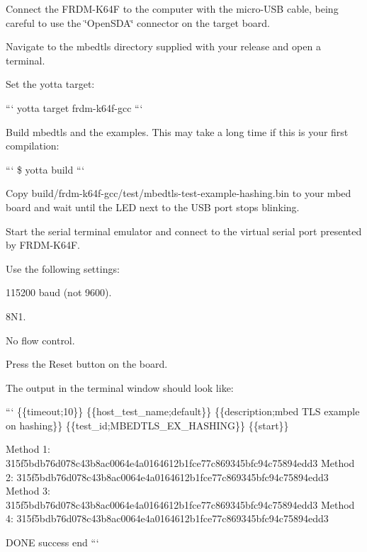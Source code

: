 \begin{DoxyEnumerate}
\item Connect the F\-R\-D\-M-\/\-K64\-F to the computer with the micro-\/\-U\-S\-B cable, being careful to use the \char`\"{}\-Open\-S\-D\-A\char`\"{} connector on the target board.
\item Navigate to the mbedtls directory supplied with your release and open a terminal.
\item Set the yotta target\-:

``` yotta target frdm-\/k64f-\/gcc ```
\item Build mbedtls and the examples. This may take a long time if this is your first compilation\-:

``` \$ yotta build ```
\item Copy {\ttfamily build/frdm-\/k64f-\/gcc/test/mbedtls-\/test-\/example-\/hashing.\-bin} to your mbed board and wait until the L\-E\-D next to the U\-S\-B port stops blinking.
\item Start the serial terminal emulator and connect to the virtual serial port presented by F\-R\-D\-M-\/\-K64\-F.

Use the following settings\-:
\begin{DoxyItemize}
\item 115200 baud (not 9600).
\item 8\-N1.
\item No flow control.
\end{DoxyItemize}
\item Press the Reset button on the board.
\item The output in the terminal window should look like\-:

``` \{\{timeout;10\}\} \{\{host\-\_\-test\-\_\-name;default\}\} \{\{description;mbed T\-L\-S example on hashing\}\} \{\{test\-\_\-id;M\-B\-E\-D\-T\-L\-S\-\_\-\-E\-X\-\_\-\-H\-A\-S\-H\-I\-N\-G\}\} \{\{start\}\}
\end{DoxyEnumerate}

\begin{DoxyVerb}Method 1: 315f5bdb76d078c43b8ac0064e4a0164612b1fce77c869345bfc94c75894edd3
Method 2: 315f5bdb76d078c43b8ac0064e4a0164612b1fce77c869345bfc94c75894edd3
Method 3: 315f5bdb76d078c43b8ac0064e4a0164612b1fce77c869345bfc94c75894edd3
Method 4: 315f5bdb76d078c43b8ac0064e4a0164612b1fce77c869345bfc94c75894edd3

DONE
{{success}}
{{end}}
```\end{DoxyVerb}
 